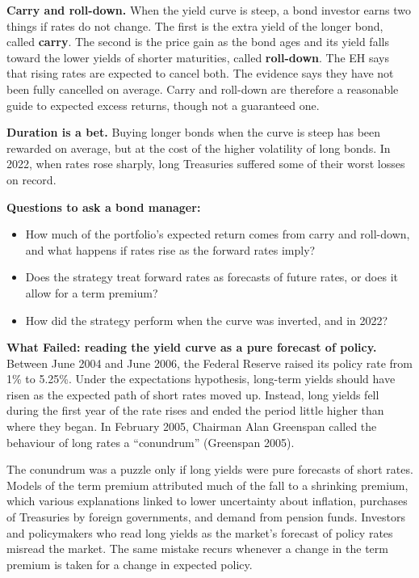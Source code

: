 \textbf{Carry and roll-down.} When the yield curve is steep, a bond investor earns two things if rates do not change. The first is the extra yield of the longer bond, called \textbf{carry}. The second is the price gain as the bond ages and its yield falls toward the lower yields of shorter maturities, called \textbf{roll-down}. The EH says that rising rates are expected to cancel both. The evidence says they have not been fully cancelled on average. Carry and roll-down are therefore a reasonable guide to expected excess returns, though not a guaranteed one.

\textbf{Duration is a bet.} Buying longer bonds when the curve is steep has been rewarded on average, but at the cost of the higher volatility of long bonds. In 2022, when rates rose sharply, long Treasuries suffered some of their worst losses on record.

\textbf{Questions to ask a bond manager:}

\begin{itemize}
  \item How much of the portfolio's expected return comes from carry and roll-down, and what happens if rates rise as the forward rates imply?
  \item Does the strategy treat forward rates as forecasts of future rates, or does it allow for a term premium?
  \item How did the strategy perform when the curve was inverted, and in 2022?
\end{itemize}

\begin{callout}
\textbf{What Failed: reading the yield curve as a pure forecast of policy.} Between June 2004 and June 2006, the Federal Reserve raised its policy rate from 1\% to 5.25\%. Under the expectations hypothesis, long-term yields should have risen as the expected path of short rates moved up. Instead, long yields fell during the first year of the rate rises and ended the period little higher than where they began. In February 2005, Chairman Alan Greenspan called the behaviour of long rates a ``conundrum'' (Greenspan 2005).

The conundrum was a puzzle only if long yields were pure forecasts of short rates. Models of the term premium attributed much of the fall to a shrinking premium, which various explanations linked to lower uncertainty about inflation, purchases of Treasuries by foreign governments, and demand from pension funds. Investors and policymakers who read long yields as the market's forecast of policy rates misread the market. The same mistake recurs whenever a change in the term premium is taken for a change in expected policy.
\end{callout}

